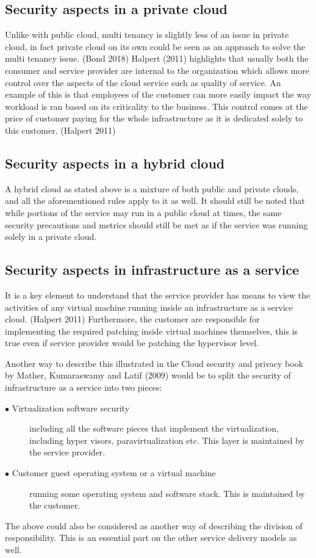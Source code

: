 \documentclass{article}
\begin{document}
\subsection{Security aspects in a private cloud}
Unlike with public cloud, multi tenancy is slightly less of an issue in private cloud, in fact private cloud on its own could be seen as an approach to solve the multi tenancy issue. (Bond 2018)
Halpert (2011) highlights that usually both the consumer and service provider are internal to the organization which allows more control over the aspects of the cloud service such as quality of service.
An example of this is that employees of the customer can more easily impact the way workload is ran based on its criticality to the business. This control comes at the price of customer paying for the whole infrastructure as it is dedicated solely to this customer. (Halpert 2011) 
\subsection{Security aspects in a hybrid cloud}
A hybrid cloud as stated above is a mixture of both public and private clouds, and all the aforementioned rules apply to it as well. It should still be noted that while portions of the service may run in a public cloud at times, the same security precautions and metrics should still be met as if the service was running solely in a private cloud.
\subsection{Security aspects in infrastructure as a service}
It is a key element to understand that the service provider has means to view the activities of any virtual machine running inside an infrastructure as a service cloud. (Halpert 2011)
Furthermore, the customer are responsible for implementing the required patching inside virtual machines themselves, this is true even if service provider would be patching the hypervisor level.
\par
Another way to describe this illustrated in the Cloud security and privacy book by Mather, Kumaraswamy and Latif (2009) would be to split the security of infrastructure as a service into two pieces:
\begin{description}
	\item[$\bullet$ Virtualization software security] including all the software pieces that implement the virtualization, including hyper visors, paravirtualization etc. This layer is maintained by the service provider.
	\item[$\bullet$ Customer guest operating system or a virtual machine] running some operating system and software stack. This is maintained by the customer.
\end{description}
The above could also be considered as another way of describing the division of responsibility. This is an essential part on the other service delivery models as well.
\end{document}
